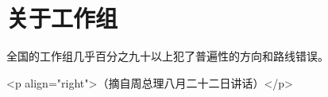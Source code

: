 \section[关于工作组（一九六六年八月）]{关于工作组}


全国的工作组几乎百分之九十以上犯了普遍性的方向和路线错误。

<p align="right">（摘自周总理八月二十二日讲话）</p>


